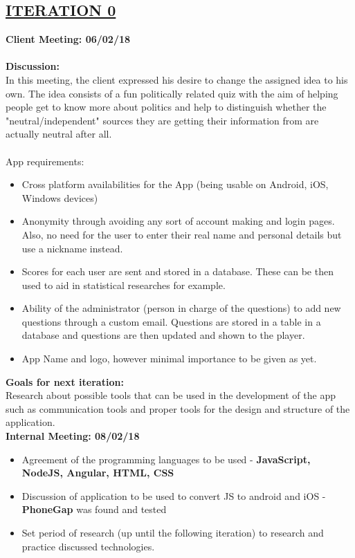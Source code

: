 \documentclass[paper=a4,fontsize=11pt]{article}
\newcommand{\sepspace}{\vspace*{1em}}		%
\newcommand{\SectionPart}[1]{\subsection*{\uppercase{#1}}}
\begin{document}
\SectionPart{\ul{Iteration 0}}
\hfill \textbf{Client Meeting: 06/02/18} \\
\\
\textbf{Discussion:}\\
\noindent
In this meeting, the client expressed his desire to change the assigned idea to his own.
The idea consists of a fun politically related quiz with the aim of helping people get to
know more about politics and help to distinguish whether the "neutral/independent" sources they
are getting their information from are actually neutral after all.\\\\
\noindent
App requirements:
\begin{itemize}
	\item Cross platform availabilities for the App (being usable on Android, iOS, Windows devices)
	\item Anonymity through avoiding any sort of account making and login pages. Also, no need for the user to enter their real name and personal details but use a nickname instead.
	\item Scores for each user are sent and stored in a database. These can be then used to aid in statistical researches for example.
	\item Ability of the administrator (person in charge of the questions) to add new questions through a custom email. Questions are stored in a table in a database and questions are then updated and shown to the player.
	\item App Name and logo, however minimal importance to be given as yet.
\end{itemize}
\sepspace

\noindent
\textbf{Goals for next iteration:}\\
\noindent
Research about possible tools that can be used in the development of the app such as communication
tools and proper tools for the design and structure of the application.\\

\hfill \textbf{Internal Meeting: 08/02/18}

\begin{itemize}
	\item Agreement of the programming languages to be used - \textbf{JavaScript, NodeJS, Angular, HTML, CSS}
	\item Discussion of application to be used to convert JS to android and iOS - \textbf{PhoneGap} was found and tested
	\item Set period of research (up until the following iteration) to research and practice discussed technologies.
\end{itemize}
\end{document}
